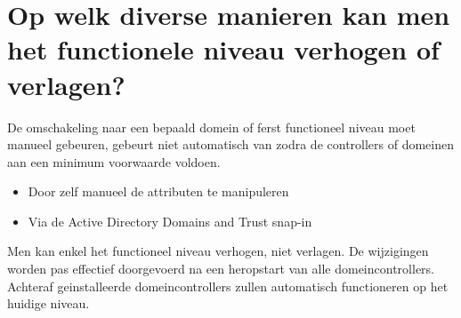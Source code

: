 \section{Op welk diverse manieren kan men het functionele niveau verhogen of
verlagen?}

De omschakeling naar een bepaald domein of ferst functioneel niveau moet manueel
gebeuren, gebeurt niet automatisch van zodra de controllers of domeinen aan een
minimum voorwaarde voldoen.
\begin{itemize}
	\item Door zelf manueel de attributen te manipuleren
	\item Via de Active Directory Domains and Trust snap-in
\end{itemize}
Men kan enkel het functioneel niveau verhogen, niet verlagen. De wijzigingen
worden pas effectief doorgevoerd na een heropstart van alle domeincontrollers.
Achteraf geinstalleerde domeincontrollers zullen automatisch functioneren op het
huidige niveau.
